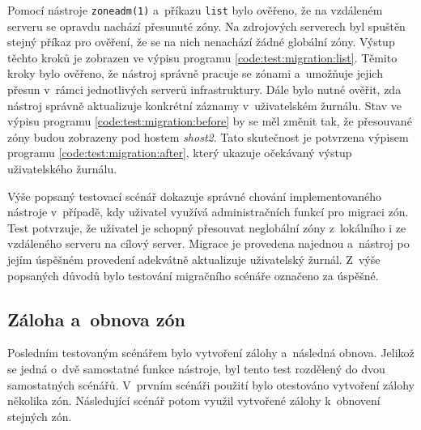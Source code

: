 Pomocí nástroje \verb|zoneadm(1)| a~příkazu \verb|list| bylo ověřeno, že na vzdáleném serveru se opravdu nachází přesunuté zóny.
Na zdrojových serverech byl spuštěn stejný příkaz pro ověření, že se na nich nenachází žádné globální zóny. Výstup těchto kroků
je zobrazen ve výpisu programu \ref{code:test:migration:list}. Těmito kroky bylo ověřeno, že nástroj správně pracuje se zónami a~umožňuje
jejich přesun v~rámci jednotlivých serverů infrastruktury. Dále bylo nutné ověřit, zda nástroj správně aktualizuje konkrétní záznamy
v~uživatelském žurnálu. Stav ve výpisu programu \ref{code:test:migration:before} by se měl změnit tak, že přesouvané zóny budou
zobrazeny pod hostem \textit{shost2}. Tato skutečnost je potvrzena výpisem programu \ref{code:test:migration:after}, který ukazuje očekávaný
výstup uživatelského žurnálu.

Výše popsaný testovací scénář dokazuje správné chování implementovaného nástroje v~případě, kdy uživatel využívá administračních
funkcí pro migraci zón. Test potvrzuje, že uživatel je schopný přesouvat neglobální zóny z~lokálního i ze vzdáleného serveru
na cílový server. Migrace je provedena najednou a~nástroj po jejím úspěšném provedení adekvátně aktualizuje uživatelský žurnál.
Z~výše popsaných důvodů bylo testování migračního scénáře označeno za úspěšné.
\subsection{Záloha a~obnova zón}
\label{chapter:testing:scenario:backup_recovery}
Posledním testovaným scénářem bylo vytvoření zálohy a~následná obnova. Jelikož se jedná o~dvě samostatné funkce nástroje, byl
tento test rozdělený do dvou samostatných scénářů. V~prvním scénáři použití bylo otestováno vytvoření zálohy několika zón. 
Následující scénář potom využil vytvořené zálohy k~obnovení stejných zón.
